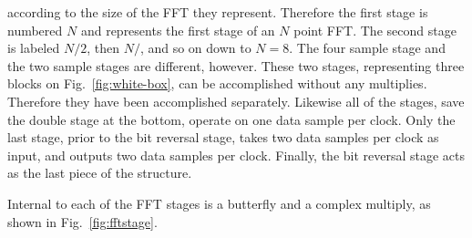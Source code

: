 \documentclass{gqtekspec}
\begin{document}
according to the size of the FFT they represent.  Therefore the first stage
is numbered $N$ and represents the first stage of an $N$ point FFT.  The
second stage is labeled $N/2$, then $N/$, and so on down to $N=8$.  The
four sample stage and the two sample stages are different, however.  These
two stages, representing three blocks on Fig.~\ref{fig:white-box}, can be
accomplished without any multiplies.  Therefore they have been accomplished
separately.  Likewise all of the stages, save the double stage at the bottom,
operate on one data sample per clock.  Only the last stage, prior to the
bit reversal stage, takes two data samples per clock as input, and outputs two 
data samples per clock.  Finally, the bit reversal stage acts as the last
piece of the structure.

Internal to each of the FFT stages is a butterfly and a complex multiply,
as shown in Fig.~\ref{fig:fftstage}. 
\end{document}
